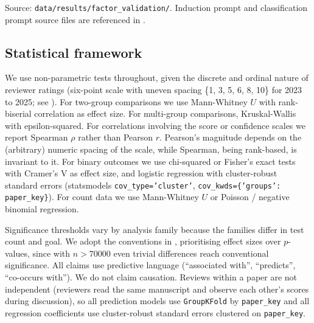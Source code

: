 \documentclass{article}
\newcommand{\code}[1]{\texttt{#1}}
\begin{document}
Source: \code{data/results/factor\_validation/}. Induction prompt and classification prompt source files are referenced in .

\subsection{Statistical framework}\label{app:stats}

We use non-parametric tests throughout, given the discrete and ordinal nature of reviewer ratings (six-point scale with uneven spacing \{1, 3, 5, 6, 8, 10\} for 2023 to 2025; see ). For two-group comparisons we use Mann-Whitney $U$ with rank-biserial correlation as effect size. For multi-group comparisons, Kruskal-Wallis with epsilon-squared. For correlations involving the score or confidence scales we report Spearman $\rho$ rather than Pearson $r$. Pearson's magnitude depends on the (arbitrary) numeric spacing of the scale, while Spearman, being rank-based, is invariant to it. For binary outcomes we use chi-squared or Fisher's exact tests with Cramer's V as effect size, and logistic regression with cluster-robust standard errors (statsmodels \code{cov\_type='cluster'}, \code{cov\_kwds=\{'groups': paper\_key\}}). For count data we use Mann-Whitney $U$ or Poisson / negative binomial regression.

Significance thresholds vary by analysis family because the families differ in test count and goal. We adopt the conventions in , prioritising effect sizes over $p$-values, since with $n > \num{70000}$ even trivial differences reach conventional significance. All claims use predictive language (``associated with'', ``predicts'', ``co-occurs with''). We do not claim causation. Reviews within a paper are not independent (reviewers read the same manuscript and observe each other's scores during discussion), so all prediction models use \texttt{GroupKFold} by \code{paper\_key} and all regression coefficients use cluster-robust standard errors clustered on \code{paper\_key}.
\end{document}
